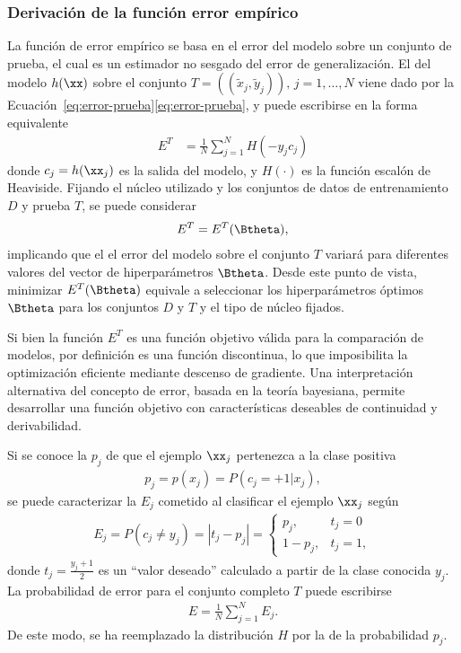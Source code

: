%
\subsubsection{Derivación de la función error empírico}
%
La función de error empírico se basa en el error del modelo sobre un
conjunto de prueba, el cual es un estimador no
sesgado del error de generalización.  El  del
modelo $h(\xx)$ sobre el conjunto
$T=((\tilde{x}_j,\tilde{y}_j)),\,j=1,\ldots,N$ viene dado por
la \iflatexml{}Ecuación~\ref{eq:error-prueba}\else\autoref{eq:error-prueba}\fi,
y puede escribirse en la forma equivalente
%
\begin{align}
\label{e3:error-test-alt}
  E^T &= \frac{1}{N}\sum_{j=1}^{N} H(-{y}_j {c}_j)
\end{align}
%
donde $c_j=h(\xx_j)$ es la salida del modelo, y
$H(\cdot)$ es la función escalón de Heaviside. Fijando el núcleo
utilizado y los conjuntos de datos de entrenamiento $D$ y prueba $T$, se
puede considerar
%
\begin{align}
\label{e3:error-test-func-theta}  
  E^T = E^T(\Btheta),
\end{align}
%
implicando que el el error del modelo sobre el conjunto $T$ variará
para diferentes valores del vector de hiperparámetros $\Btheta$.
Desde este punto de vista, minimizar $E^T(\Btheta)$ equivale a
seleccionar los hiperparámetros óptimos $\Btheta$ para los conjuntos
$D$ y $T$ y el tipo de núcleo fijados.

Si bien la función $E^T$ es una función objetivo válida para la
comparación de modelos, por definición es una función discontinua, lo
que imposibilita la optimización eficiente mediante descenso de
gradiente. Una interpretación alternativa del concepto de error,
basada en la teoría bayesiana, permite desarrollar una función
objetivo con características deseables de continuidad y derivabilidad.

Si se conoce la  $p_j$ de que el ejemplo
$\xx_j$ pertenezca a la clase positiva
%
\begin{align}
  \label{e3:pk}
  p_j = p(x_j) = P(c_j=+1|x_j),
\end{align}
%
se puede caracterizar la  $E_j$ cometido al
clasificar el ejemplo $\xx_j$ según
%
\begin{align}
\label{e3:Ek}
  E_j = P(c_j\neq y_j) = |t_j-{p}_j| =
  \begin{cases}
    {p}_j, & t_j=0\\ 1-{p}_j, & t_j = 1,
  \end{cases}
\end{align}
%
donde $t_j=\frac{y_j+1}{2}$ es un ``valor deseado'' calculado a partir
de la clase conocida $y_j$. La probabilidad de error para el conjunto
completo $T$ puede escribirse
%
\begin{align}
\label{Err1}
  E = \frac{1}{N}\sum_{j=1}^{N} E_j.
\end{align}
%
De este modo, se ha reemplazado la distribución $H$ por la de la probabilidad
$p_j$.

